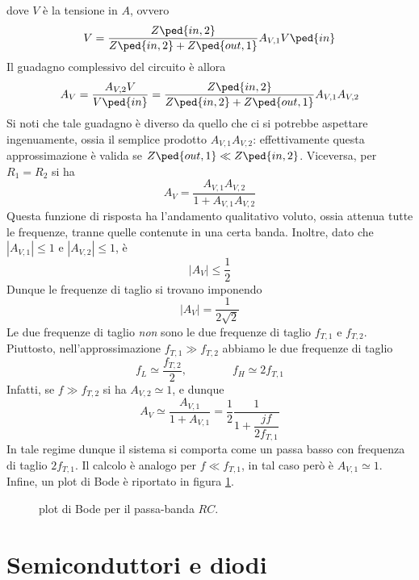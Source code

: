 \documentclass[a4paper, 11pt]{article}
\begin{document}
	\noindent dove $V$ è la tensione in $A$, ovvero
	\[V=\frac{Z\ped{in,2}}{Z\ped{in,2}+Z\ped{out,1}}A_{V,1}V\ped{in}\]
	Il guadagno complessivo del circuito è allora
	\[A_V=\frac{A_{V,2}V}{V\ped{in}}=\frac{Z\ped{in,2}}{Z\ped{in,2}+Z\ped{out,1}}A_{V,1}A_{V,2}\]
	Si noti che tale guadagno è diverso da quello che ci si potrebbe aspettare ingenuamente, ossia il semplice prodotto $A_{V,1}A_{V,2}$: effettivamente questa approssimazione è valida se $Z\ped{out,1}\ll Z\ped{in,2}$. Viceversa, per $R_1=R_2$ si ha 
	\[A_V=\frac{A_{V,1}A_{V,2}}{1+A_{V,1}A_{V,2}}\]
	Questa funzione di risposta ha l'andamento qualitativo voluto, ossia attenua tutte le frequenze, tranne quelle contenute in una certa banda. Inoltre, dato che $|A_{V,1}|\leq1$ e $|A_{V,2}|\leq 1$, è
	\[|A_V|\leq\frac{1}{2}\]
	Dunque le frequenze di taglio si trovano imponendo
	\[|A_V|=\frac{1}{2\sqrt{2}}\]Le due frequenze di taglio \emph{non} sono le due frequenze di taglio $f_{T,1}$ e $f_{T,2}$. Piuttosto, nell'approssimazione $f_{T,1}\gg f_{T,2}$ abbiamo le due frequenze di taglio
	\[f_L\simeq\frac{f_{T,2}}{2},\qquad\qquad f_H\simeq2f_{T,1}\]
	Infatti, se $f\gg f_{T,2}$ si ha $A_{V,2}\simeq1$, e dunque
	\[A_V\simeq\frac{A_{V,1}}{1+A_{V,1}}=\frac{1}{2}\frac{1}{1+\dfrac{j f}{2f_{T,1}}}\]
	In tale regime dunque il sistema si comporta come un passa basso con frequenza di taglio $2f_{T,1}$. Il calcolo è analogo per $f\ll f_{T,1}$, in tal caso però è $A_{V,1}\simeq1$. Infine, un plot di Bode è riportato in figura \ref{fig:bodepassabanda}.
	\begin{figure}[h!]
		\centering
		\caption{plot di Bode per il passa-banda $RC$.}
		\label{fig:bodepassabanda}	
	\end{figure}
	\newpage
	\section{Semiconduttori e diodi}
\end{document}
